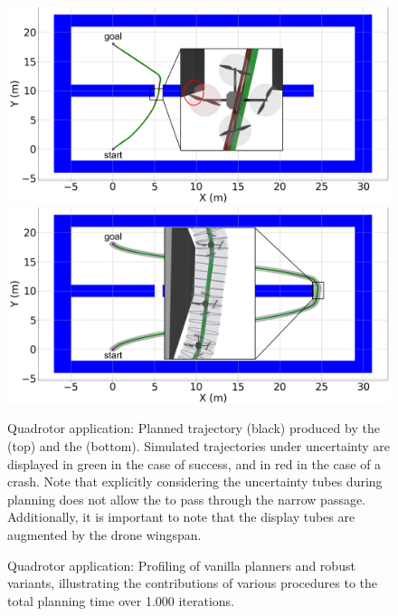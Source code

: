 \begin{figure} [h!]
    \centering
    \includegraphics[width=0.8\linewidth]{figures/samp/non_robust_quad.png}
    \includegraphics[width=0.8\linewidth]{figures/samp/robust_quad.png}
    \caption{Quadrotor application: Planned trajectory (black) produced by the  (top) and the  (bottom). 
    Simulated trajectories under uncertainty are displayed in green in the case of success, and in red in the case of a crash.
    Note that explicitly considering the uncertainty tubes during planning does not allow the  to pass through the narrow passage.
    Additionally, it is important to note that the display tubes are augmented by the drone wingspan.}%
    \label{fig:robust_quad}%
\end{figure}

\begin{figure} [h!]
    \centering
     
    \caption{Quadrotor application: Profiling of vanilla planners and robust variants, illustrating the contributions of various procedures to the total planning time over 1.000 iterations.
    }%
    \label{fig:profiling_quad}%
\end{figure}

